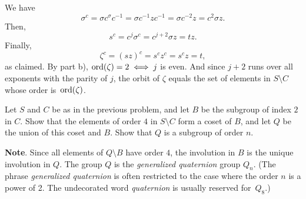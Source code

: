 \begin{solution}
\begin{enumerate}[a),font=\upshape]
    We have
    $$
        \sigma^c = \sigma c^\sigma c^{-1}
            = \sigma c^{-1}zc^{-1}
            = \sigma c^{-2}z = c^2\sigma z.
    $$
    Then,
    $$
        s^c = c^j\sigma^c
            = c^{j+2}\sigma z
            = tz.
    $$
    Finally,
    $$
        \zeta^c=(sz)^c=s^c z^c=s^cz=t,
    $$
    as claimed. By part b), ${\rm ord}(\zeta)=2\iff j$ is even. And since $j+2$ runs over all exponents with the parity of $j$, the orbit of $\zeta$ equals the set of elements in $S\setminus C$ whose order is~${\rm ord}(\zeta)$.
\end{enumerate}
\end{solution}

\begin{probl}
    Let\/ $S$ and\/ $C$ be as in the previous problem, and let\/ $B$ be the subgroup of index\/ $2$ in\/ $C$. Show that the elements of order\/ $4$ in\/ $S\setminus C$ form a coset of\/ $B$, and let\/ $Q$ be the union of this coset and\/ $B$. Show that\/ $Q$ is a subgroup of order\/ $n$.
    
    \textrm{\normalfont\textbf{Note}. Since all elements of\/ $Q\setminus B$ have order $4$, the involution in\/ $B$ is the unique involution in\/ $Q$. The group\/ $Q$ is the \textsl{generalized quaternion} group\/ $Q_n$. (The phrase \textit{generalized quaternion\/} is often restricted to the case where the order\/ $n$ is a power of 2. The undecorated word \textit{quaternion\/} is usually reserved for\/~$Q_8$.)}
\end{probl}

